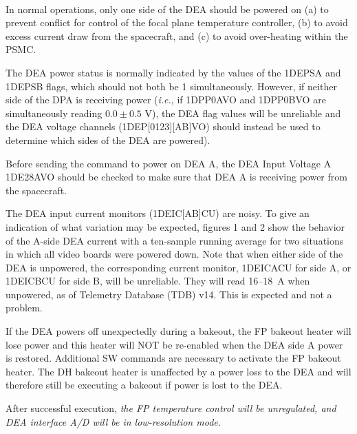 \documentclass[11pt]{article}
\begin{document}
\normalsize
{} \\
\normalsize

In normal operations, only one side of the DEA should be powered on
(a) to prevent conflict for control of the focal plane temperature controller,
(b) to avoid excess current draw from the spacecraft, and (c) to avoid over-heating
within the PSMC.

The DEA power status is normally indicated by the values of the 1DEPSA and
1DEPSB flags, which should not both be 1 simultaneously.
However, if neither side of the DPA is receiving power
({\it i.e.}, if 1DPP0AVO and 1DPP0BVO are simultaneously reading $0.0 \pm 0.5$ V),
the DEA flag values will be unreliable and the DEA voltage
channels (1DEP[0123][AB]VO) should instead be used to determine which
sides of the DEA are powered).

Before sending the command to power on DEA A, the DEA Input Voltage A 1DE28AVO should
be checked to make sure that DEA A is receiving power from the spacecraft.

The DEA input current monitors (1DEIC[AB]CU) are noisy.
To give an indication of what variation may be expected, figures 1 and 2
show the behavior of the A-side DEA current with a ten-sample running
average for two situations in which all video boards were powered down. Note that
when either side of the DEA is unpowered, the corresponding current monitor, 
1DEICACU for side A, or 1DEICBCU for side B, will be unreliable. They will read
16--18~A when unpowered, as of Telemetry Database (TDB) v14. This is expected and
not a problem.

If the DEA powers off unexpectedly during a bakeout, the FP bakeout 
heater will lose power and this heater will NOT be re-enabled when the DEA side A 
power is restored. Additional SW commands are necessary to activate the FP bakeout 
heater. The DH bakeout heater is unaffected by a power loss to the DEA and will 
therefore still be executing a bakeout if power is lost to the DEA.

After successful execution, {\em the FP temperature control will be unregulated,
and DEA interface A/D will be in low-resolution mode.}\\

\vspace{0.15in}
\normalsize
{} \\
\normalsize

\normalsize
{} \\
\normalsize
\end{document}

